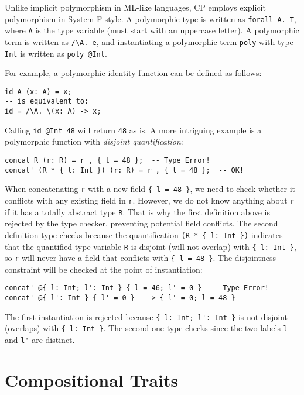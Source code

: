 Unlike implicit polymorphism in ML-like languages, CP employs explicit
polymorphism in System-F style. A polymorphic type is written as
\lstinline{forall A. T}, where \lstinline{A} is the type variable (must start
with an uppercase letter). A polymorphic term is written as \lstinline|/\A. e|,
and instantiating a polymorphic term \lstinline{poly} with type \lstinline{Int}
is written as \lstinline{poly @Int}.

For example, a polymorphic identity function can be defined as follows:
\begin{lstlisting}
id A (x: A) = x;
-- is equivalent to:
id = /\A. \(x: A) -> x;
\end{lstlisting}
Calling \lstinline{id @Int 48} will return \lstinline{48} as is. A more
intriguing example is a polymorphic function with \emph{disjoint
quantification}:
\begin{lstlisting}
concat R (r: R) = r , { l = 48 };  -- Type Error!
concat' (R * { l: Int }) (r: R) = r , { l = 48 };  -- OK!
\end{lstlisting}
When concatenating \lstinline{r} with a new field \lstinline|{ l = 48 }|, we
need to check whether it conflicts with any existing field in \lstinline{r}.
However, we do not know anything about \lstinline{r} if it has a totally
abstract type \lstinline{R}. That is why the first definition above is rejected
by the type checker, preventing potential field conflicts. The second definition
type-checks because the quantification \lstinline|(R * { l: Int })| indicates
that the quantified type variable \lstinline{R} is disjoint (will not overlap)
with \lstinline|{ l: Int }|, so \lstinline{r} will never have a field that
conflicts with \lstinline|{ l = 48 }|. The disjointness constraint will be
checked at the point of instantiation:
\begin{lstlisting}
concat' @{ l: Int; l': Int } { l = 46; l' = 0 }  -- Type Error!
concat' @{ l': Int } { l' = 0 }  --> { l' = 0; l = 48 }
\end{lstlisting}
The first instantiation is rejected because \lstinline|{ l: Int; l': Int }| is
not disjoint (overlaps) with \lstinline|{ l: Int }|. The second one type-checks
since the two labels \lstinline{l} and \lstinline{l'} are distinct.

\section{Compositional Traits}

